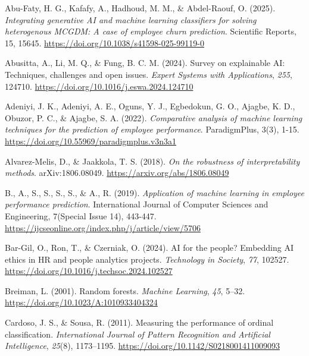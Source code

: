 \documentclass[
  a4paper,
  review]{elsarticle}
\newlength{\cslhangindent}
\newenvironment{CSLReferences}[2] %
 {\begin{list}{}{%
  \setlength{\itemindent}{0pt}
  \setlength{\leftmargin}{0pt}
  \setlength{\parsep}{0pt}
  \ifodd #1
   \setlength{\leftmargin}{\cslhangindent}
   \setlength{\itemindent}{-1\cslhangindent}
  \fi
  \setlength{\itemsep}{#2\baselineskip}}}
 {\end{list}}
\begin{document}
\protect{}\label{refs}
\begin{CSLReferences}{1}{0}
Abu-Faty, H. G., Kafafy, A., Hadhoud, M. M., \& Abdel-Raouf, O. (2025).
\emph{Integrating generative AI and machine learning classifiers for
solving heterogenous MCGDM: A case of employee churn prediction}.
Scientific Reports, 15, 15645.
\url{https://doi.org/10.1038/s41598-025-99119-0}

Abusitta, A., Li, M. Q., \& Fung, B. C. M. (2024). Survey on explainable
AI: Techniques, challenges and open issues. \emph{Expert Systems with
Applications}, \emph{255}, 124710.
\url{https://doi.org/10.1016/j.eswa.2024.124710}

Adeniyi, J. K., Adeniyi, A. E., Oguns, Y. J., Egbedokun, G. O., Ajagbe,
K. D., Obuzor, P. C., \& Ajagbe, S. A. (2022). \emph{Comparative
analysis of machine learning techniques for the prediction of employee
performance}. ParadigmPlus, 3(3), 1-15.
\url{https://doi.org/10.55969/paradigmplus.v3n3a1}

Alvarez-Melis, D., \& Jaakkola, T. S. (2018). \emph{On the robustness of
interpretability methods}. arXiv:1806.08049.
\url{https://arxiv.org/abs/1806.08049}

B., A., S., S., S., S., \& A., R. (2019). \emph{Application of machine
learning in employee performance prediction}. International Journal of
Computer Sciences and Engineering, 7(Special Issue 14), 443-447.
\url{https://ijcseonline.org/index.php/j/article/view/5706}

Bar-Gil, O., Ron, T., \& Czerniak, O. (2024). AI for the people?
Embedding AI ethics in HR and people analytics projects.
\emph{Technology in Society}, \emph{77}, 102527.
\url{https://doi.org/10.1016/j.techsoc.2024.102527}

Breiman, L. (2001). Random forests. \emph{Machine Learning}, \emph{45},
5--32. \url{https://doi.org/10.1023/A:1010933404324}

Cardoso, J. S., \& Sousa, R. (2011). Measuring the performance of
ordinal classification. \emph{International Journal of Pattern
Recognition and Artificial Intelligence}, \emph{25}(8), 1173--1195.
\url{https://doi.org/10.1142/S0218001411009093}


\end{CSLReferences}
\end{document}
